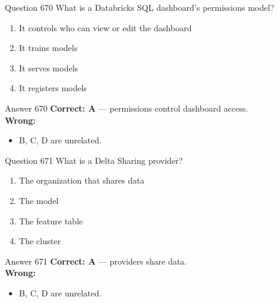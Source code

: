 \documentclass[aspectratio=169,11pt]{beamer}
\begin{document}
	\begin{frame}{Question 670}
		What is a Databricks SQL dashboard's permissions model?
		\begin{enumerate}[label=\Alph*.]
			\item It controls who can view or edit the dashboard
			\item It trains models
			\item It serves models
			\item It registers models
		\end{enumerate}
	\end{frame}
	\begin{frame}{Answer 670}
		\textbf{Correct: A} --- permissions control dashboard access.\\
		\vspace{0.5em}
		\textbf{Wrong:}
		\begin{itemize}
			\item B, C, D are unrelated.
		\end{itemize}
	\end{frame}
	
	\begin{frame}{Question 671}
		What is a Delta Sharing provider?
		\begin{enumerate}[label=\Alph*.]
			\item The organization that shares data
			\item The model
			\item The feature table
			\item The cluster
		\end{enumerate}
	\end{frame}
	\begin{frame}{Answer 671}
		\textbf{Correct: A} --- providers share data.\\
		\vspace{0.5em}
		\textbf{Wrong:}
		\begin{itemize}
			\item B, C, D are unrelated.
		\end{itemize}
	\end{frame}
	
\end{document}
